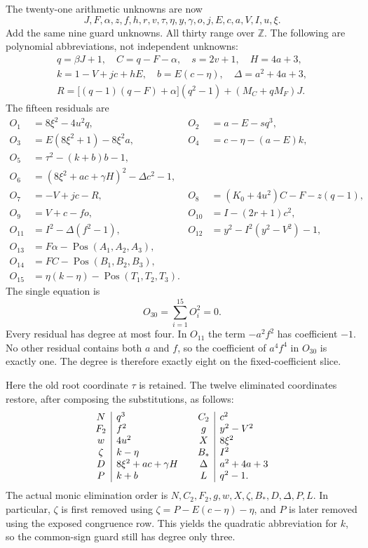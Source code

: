 The twenty-one arithmetic unknowns are now
\[
 J,F,\alpha,z,f,h,r,v,\tau,\eta,y,\gamma,o,j,E,c,a,V,I,u,\xi.
\]
Add the same nine guard unknowns. All thirty range over $\mathbb Z$.
The following are polynomial abbreviations, not independent unknowns:
\begin{gather*}
 q=\beta J+1,\quad C=q-F-\alpha,\quad s=2v+1,\quad H=4a+3,\\
 k=1-V+jc+hE,\quad b=E(c-\eta),\quad \Delta=a^2+4a+3,\\
 R=\bigl[(q-1)(q-F)+\alpha\bigr](q^2-1)+(M_C+qM_F)J.
\end{gather*}
The fifteen residuals are
\begin{align}
 O_1&=8\xi^2-4u^2q, &
 O_2&=a-E-sq^3, \nonumber\\
 O_3&=E(8\xi^2+1)-8\xi^2a, &
 O_4&=c-\eta-(a-E)k, \nonumber\\
 O_5&=\tau^2-(k+b)b-1, &&\nonumber\\
 O_6&=(8\xi^2+ac+\gamma H)^2-\Delta c^2-1, &&\nonumber\\
 O_7&=-V+jc-R, &
 O_8&=(K_0+4u^2)C-F-z(q-1), \nonumber\\
 O_9&=V+c-fo, &
 O_{10}&=I-(2r+1)c^2, \nonumber\\
 O_{11}&=I^2-\Delta(f^2-1), &
 O_{12}&=y^2-I^2(y^2-V^2)-1, \nonumber\\
 O_{13}&=F\alpha-\operatorname{Pos}(A_1,A_2,A_3), &&\nonumber\\
 O_{14}&=FC-\operatorname{Pos}(B_1,B_2,B_3), &&\nonumber\\
 O_{15}&=\eta(k-\eta)-\operatorname{Pos}(T_1,T_2,T_3). &&
 \label{eq:octic30-residuals}
\end{align}
The single equation is
\begin{equation}
 \boxed{\displaystyle O_{30}=\sum_{i=1}^{15}O_i^2=0.}
 \label{eq:octic30}
\end{equation}
Every residual has degree at most four. In $O_{11}$ the term
$-a^2f^2$ has coefficient $-1$. No other residual contains both $a$ and
$f$, so the coefficient of $a^4f^4$ in $O_{30}$ is exactly one. The
degree is therefore exactly eight on the fixed-coefficient slice.

Here the old root coordinate $\tau$ is retained. The twelve eliminated
coordinates restore, after composing the substitutions, as follows:
\[
 \begin{array}{c|l@{\qquad}c|l}
 N&q^3 & C_2&c^2\\
 F_2&f^2 & g&y^2-V^2\\
 w&4u^2 & X&8\xi^2\\
 \zeta&k-\eta & B_*&I^2\\
 D&8\xi^2+ac+\gamma H & \Delta&a^2+4a+3\\
 P&k+b & L&q^2-1.
 \end{array}
\]
The actual monic elimination order is
$N,C_2,F_2,g,w,X,\zeta,B_*,D,\Delta,P,L$.
In particular, $\zeta$ is first removed using
$\zeta=P-E(c-\eta)-\eta$, and $P$ is later removed using the exposed
congruence row. This yields the quadratic abbreviation for $k$, so the
common-sign guard still has degree only three.

